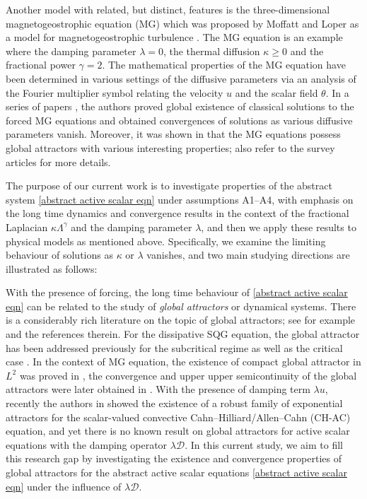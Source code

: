 \documentclass[reqno]{amsart}%
\theoremstyle{definition}
\theoremstyle{remark}
\numberwithin{equation}{section}
\newcommand{\1}{\mathbf{1}}
\numberwithin{equation}{section}
\numberwithin{theorem}{section}
\numberwithin{figure}{section}
\begin{document}
Another model with related, but distinct, features is the three-dimensional magnetogeostrophic equation (MG) which was proposed by Moffatt and Loper as a model for magnetogeostrophic turbulence \cite{FV11a, FRV14, M08, ML94}. The MG equation is an example where the damping parameter $\lambda=0$, the thermal diffusion $\kappa\ge0$ and the fractional power $\gamma=2$. The mathematical properties of the MG equation have been determined in various settings of the diffusive parameters via an analysis of the Fourier multiplier symbol relating the velocity $u$ and the scalar field $\theta$. In a series of papers \cite{FS15, FS18, FS19}, the authors proved global existence of classical solutions to the forced MG equations and obtained convergences of solutions as various diffusive parameters vanish. Moreover, it was shown in \cite{FS21} that the MG equations possess global attractors with various interesting properties; also refer to the survey articles \cite{FRV14, FS23} for more details. 

The purpose of our current work is to investigate properties of the abstract system \eqref{abstract active scalar eqn} under assumptions A1--A4, with emphasis on the long time dynamics and convergence results in the context of the fractional Laplacian $\kappa\Lambda^{\gamma}$ and the damping parameter $\lambda$, and then we apply these results to physical models as mentioned above. Specifically, we examine the limiting behaviour of solutions as $\kappa$ or $\lambda$ vanishes, and two main studying directions are illustrated as follows:

 With the presence of forcing, the long time behaviour of \eqref{abstract active scalar eqn} can be related to the study of {\it global attractors} or dynamical systems. There is a considerably rich literature on the topic of global attractors; see for example \cite{CCP12, CD14, CF85, HOR15, Ra02, R13, RP03} and the references therein. For the dissipative SQG equation, the global attractor has been addressed previously for the subcritical regime \cite{Ju05, WY13, Ze18} as well as the critical case \cite{CTV14, CZV16}. In the context of MG equation, the existence of compact global attractor in $L^2$ was proved in \cite{FS18}, the convergence and upper upper semicontinuity of the global attractors were later obtained in \cite{FS21}. With the presence of damping term $\lambda u$, recently the authors in \cite{GST25} showed the existence of a robust family of exponential attractors for the scalar-valued convective Cahn–Hilliard/Allen–Cahn (CH-AC) equation, and yet there is no known result on global attractors for active scalar equations with the damping operator $\lambda\mathcal{D}$. In this current study, we aim to fill this research gap by investigating the existence and convergence properties of global attractors for the abstract active scalar equations \eqref{abstract active scalar eqn} under the influence of $\lambda\mathcal{D}$.
\end{document}

